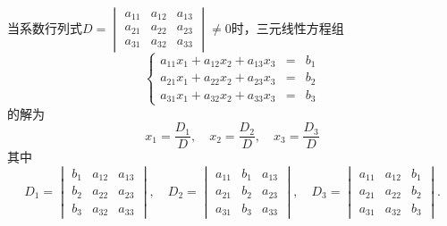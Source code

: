 \begin{prop}[含参三元一次方程组的解]\

当系数行列式$D = \begin{vmatrix} a_{11} & a_{12} & a_{13} \\ a_{21} & a_{22} & a_{23} \\ a_{31} & a_{32} & a_{33} \end{vmatrix} \neq 0$时，三元线性方程组
$$\left\{ \begin{array}{rcl} a_{11}x_1 + a_{12}x_2 + a_{13}x_3 & = & b_1 \\ a_{21}x_1 + a_{22}x_2 + a_{23}x_3 & = & b_2 \\ a_{31}x_1 + a_{32}x_2 + a_{33}x_3 & = & b_3 \end{array}\right.$$
的解为
$$x_1 = \frac{D_1}{D}, \quad x_2 = \frac{D_2}{D}, \quad x_3 = \frac{D_3}{D}$$
其中
$$D_1 = \begin{vmatrix} b_1 & a_{12} & a_{13} \\ b_2 & a_{22} & a_{23} \\ b_3 & a_{32} & a_{33} \end{vmatrix}, \quad D_2 = \begin{vmatrix} a_{11} & b_1 & a_{13} \\ a_{21} & b_2 & a_{23}  \\ a_{31} & b_3 & a_{33} \end{vmatrix}, \quad D_3 = \begin{vmatrix} a_{11} & a_{12} & b_1 \\ a_{21} & a_{22} & b_2   \\ a_{31} & a_{32} & b_3 \end{vmatrix}.$$
\end{prop}


